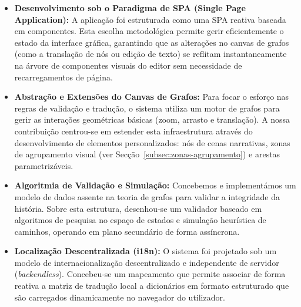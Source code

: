 \begin{itemize}
    \item \textbf{Desenvolvimento sob o Paradigma de SPA (Single Page Application):}
    A aplicação foi estruturada como uma SPA reativa baseada em componentes. Esta escolha metodológica permite gerir eficientemente o estado da interface gráfica, garantindo que as alterações no canvas de grafos (como a translação de nós ou edição de texto) se reflitam instantaneamente na árvore de componentes visuais do editor sem necessidade de recarregamentos de página.
    
    \item \textbf{Abstração e Extensões do Canvas de Grafos:}
    Para focar o esforço nas regras de validação e tradução, o sistema utiliza um motor de grafos para gerir as interações geométricas básicas (zoom, arrasto e translação). A nossa contribuição centrou-se em estender esta infraestrutura através do desenvolvimento de elementos personalizados: nós de cenas narrativas, zonas de agrupamento visual (ver Secção~\ref{subsec:zonas-agrupamento}) e arestas parametrizáveis.
    
    \item \textbf{Algoritmia de Validação e Simulação:}
    Concebemos e implementámos um modelo de dados assente na teoria de grafos para validar a integridade da história. Sobre esta estrutura, desenhou-se um validador baseado em algoritmos de pesquisa no espaço de estados e simulação heurística de caminhos, operando em plano secundário de forma assíncrona.

    \item \textbf{Localização Descentralizada (i18n):}
    O sistema foi projetado sob um modelo de internacionalização descentralizado e independente de servidor (\textit{backendless}). Concebeu-se um mapeamento que permite associar de forma reativa a matriz de tradução local a dicionários em formato estruturado que são carregados dinamicamente no navegador do utilizador.
\end{itemize}


